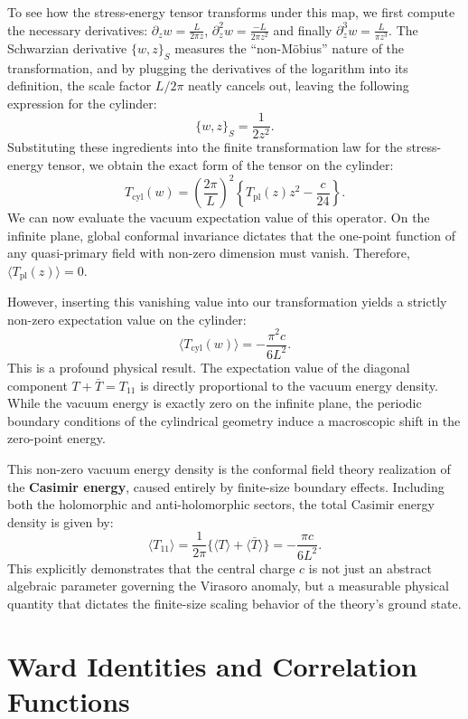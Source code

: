 To see how the stress-energy tensor transforms under this map, we first compute the necessary derivatives: \(\partial_z w = \frac{L}{2\pi z}\), \(\partial_z^2 w = \frac{-L}{2 \pi z^2}\) and finally \(\partial_z^3 w = \frac{L}{\pi z^3}\). The Schwarzian derivative \(\{w, z\}_S\) measures the ``non-Möbius'' nature of the transformation, and by plugging the derivatives of the logarithm into its definition, the scale factor \(L/2\pi\) neatly cancels out, leaving the following expression for the cylinder:
\[
    \{w, z\}_S = \frac{1}{2z^2}.
\]
Substituting these ingredients into the finite transformation law for the stress-energy tensor, we obtain the exact form of the tensor on the cylinder:
\[
    T_{\text{cyl}}(w) = \left(\frac{2\pi}{L}\right)^2 \left\{ T_{\text{pl}}(z)z^2 - \frac{c}{24} \right\}.
\]
We can now evaluate the vacuum expectation value of this operator. On the infinite plane, global conformal invariance dictates that the one-point function of any quasi-primary field with non-zero dimension must vanish. Therefore, \(\langle T_{\text{pl}}(z) \rangle = 0\).

However, inserting this vanishing value into our transformation yields a strictly non-zero expectation value on the cylinder:
\[
    \langle T_{\text{cyl}}(w) \rangle = -\frac{\pi^2 c}{6L^2}.
\]
This is a profound physical result. The expectation value of the diagonal component \(T + \bar{T} = T_{11}\) is directly proportional to the vacuum energy density. While the vacuum energy is exactly zero on the infinite plane, the periodic boundary conditions of the cylindrical geometry induce a macroscopic shift in the zero-point energy.

This non-zero vacuum energy density is the conformal field theory realization of the \textbf{Casimir energy}, caused entirely by finite-size boundary effects. Including both the holomorphic and anti-holomorphic sectors, the total Casimir energy density is given by:
\[
    \langle T_{11} \rangle = \frac{1}{2\pi} \{ \langle T \rangle + \langle \bar{T} \rangle \} = -\frac{\pi c}{6L^2}.
\]
This explicitly demonstrates that the central charge \(c\) is not just an abstract algebraic parameter governing the Virasoro anomaly, but a measurable physical quantity that dictates the finite-size scaling behavior of the theory's ground state.

\section{Ward Identities and Correlation Functions}

